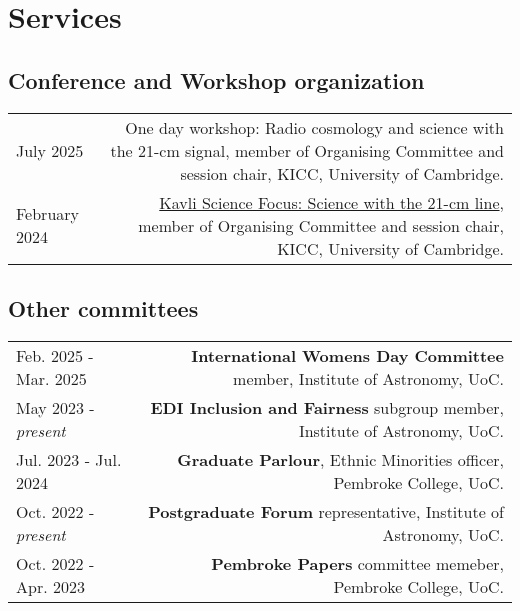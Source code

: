 \documentclass{article}
\begin{document}
\clearpage

\section*{Services}

\subsection*{Conference and Workshop organization}

\begin{longtable}{L!{\vrule}R}

  July 2025  & One day workshop: Radio cosmology and science with the 21-cm signal, member of Organising Committee and session chair, KICC, University of Cambridge. \\

  February 2024 & \href{https://www.kicc.cam.ac.uk/events/kavli-science-themed-meetings/science-21-cm-hydrogen-line}{Kavli Science Focus: Science with the 21-cm line}, member of Organising Committee and session chair, KICC, University of Cambridge. \\
\end{longtable}

\subsection*{Other committees}

\begin{longtable}{L!{\vrule}R}

  Feb. 2025 - Mar. 2025 & \textbf{International Womens Day Committee} member, Institute of Astronomy, UoC. \\

  May 2023 - \textit{present} & \textbf{EDI Inclusion and Fairness} subgroup member, Institute of Astronomy, UoC. \\

  Jul. 2023 - Jul. 2024 & \textbf{Graduate Parlour}, Ethnic Minorities officer, Pembroke College, UoC. \\

  Oct. 2022 - \textit{present} & \textbf{Postgraduate Forum} representative, Institute of Astronomy, UoC. \\

  Oct. 2022 - Apr. 2023 & \textbf{Pembroke Papers} committee memeber, Pembroke College, UoC. \\
\end{longtable}
\end{document}
